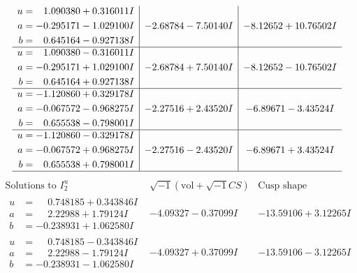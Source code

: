 \documentclass[1p]{elsarticle_modified}
\theoremstyle{definition}
\newcommand{\I}{\sqrt{-1}}
\begin{document}
$$\begin{array}{c|c|c}
\begin{aligned}
u &= \phantom{-}1.090380 + 0.316011 I \\
a &= -0.295171 - 1.029100 I \\
b &= \phantom{-}0.645164 - 0.927138 I\end{aligned}
 & -2.68784 - 7.50140 I & -8.12652 + 10.76502 I \\ \hline\begin{aligned}
u &= \phantom{-}1.090380 - 0.316011 I \\
a &= -0.295171 + 1.029100 I \\
b &= \phantom{-}0.645164 + 0.927138 I\end{aligned}
 & -2.68784 + 7.50140 I & -8.12652 - 10.76502 I \\ \hline\begin{aligned}
u &= -1.120860 + 0.329178 I \\
a &= -0.067572 - 0.968275 I \\
b &= \phantom{-}0.655538 - 0.798001 I\end{aligned}
 & -2.27516 + 2.43520 I & -6.89671 - 3.43524 I \\ \hline\begin{aligned}
u &= -1.120860 - 0.329178 I \\
a &= -0.067572 + 0.968275 I \\
b &= \phantom{-}0.655538 + 0.798001 I\end{aligned}
 & -2.27516 - 2.43520 I & -6.89671 + 3.43524 I\\
 \hline 
 \end{array}$$\newpage$$\begin{array}{c|c|c}  
\text{Solutions to }I^u_{2}& \I (\text{vol} + \sqrt{-1}CS) & \text{Cusp shape}\\
 \hline 
\begin{aligned}
u &= \phantom{-}0.748185 + 0.343846 I \\
a &= \phantom{-}2.22988 + 1.79124 I \\
b &= -0.238931 + 1.062580 I\end{aligned}
 & -4.09327 - 0.37099 I & -13.59106 + 3.12265 I \\ \hline\begin{aligned}
u &= \phantom{-}0.748185 - 0.343846 I \\
a &= \phantom{-}2.22988 - 1.79124 I \\
b &= -0.238931 - 1.062580 I\end{aligned}
 & -4.09327 + 0.37099 I & -13.59106 - 3.12265 I \\ \hline\begin{aligned}

\end{aligned}
\end{array}$$
\end{document}
